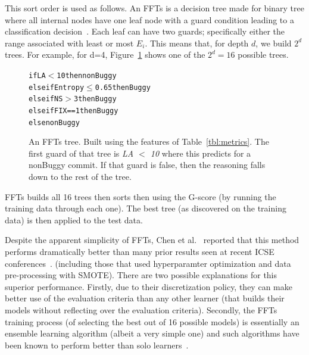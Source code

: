 \documentclass[10pt,journal,compsoc]{IEEEtran}
\newcommand{\fig}[1]{Figure~\ref{fig:#1}}
\newcommand{\tbl}[1]{Table~\ref{tbl:#1}}
\begin{document}
This sort order is used as follows.
 An FFTs is a decision tree made for binary tree where all internal nodes
have one leaf node with a guard condition leading to a classification decision~\cite{martignon2008categorization}.  Each leaf can have two  guards; specifically either the range associated with least or most $E_i$. This means  that,
for depth $d$, we build    $2^d$ trees.
For example, for d=4, \fig{fft} shows  one of the $2^d=16$ possible trees.
\begin{figure}
{\small
\begin{alltt}
    if          LA   \(<\)   10     then nonBuggy   
    else if     Entropy \(\le\) 0.65  then Buggy    
    else if     NS \(>\) 3          then Buggy   
    else if     FIX == 1        \hspace{0.02in}then Buggy    
    else                        \hspace{0.02in}nonBuggy        
\end{alltt}}
\caption{An FFTs tree. Built using the features of \tbl{metrics}.
The first guard of that tree is  {\em LA $<$ 10}  where this predicts for a nonBuggy commit. If that guard is false, then the reasoning falls down to the rest of the tree.
}\label{fig:fft}
\end{figure}
FFTs builds all 16 trees then sorts then  using the G-score  (by running  the training data through each one). The best tree (as discovered on the training data) is then applied to the test data.



Despite the apparent simplicity of  FFTs, Chen et al.~\cite{di18_fft}
reported that this method performs dramatically
better than many prior results
seen at recent ICSE conferences~\cite{ghotra15,agrawal2018better}.
(including those that used hyperparamter optimization
and data pre-processing with SMOTE). 
There are two possible
explanations for this superior performance. Firstly, due to their discretization policy, they can make better use of the evaluation criteria than any other learner (that builds
their models without reflecting over  the evaluation criteria). Secondly, the FFTs training process (of selecting the best out of 16 possible models) is essentially an ensemble
learning algorithm (albeit a very simple one) and such algorithms have been known to perform better than solo learners~\cite{kocaguneli2012value}.


 
\end{document}
